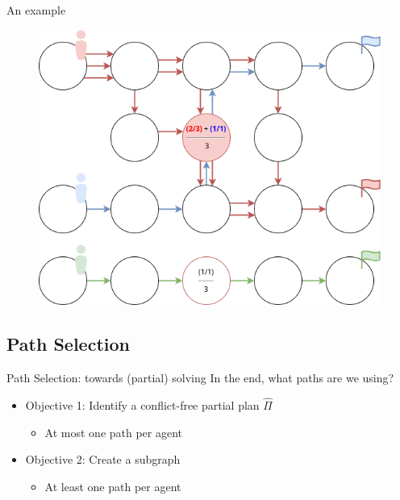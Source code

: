 \begin{frame}{An example}
    \begin{figure}[H]
        \centering
        \includegraphics[width=\widthimg]{img/pe_one_heatmap_value_example.drawio.png}
    \end{figure}
\end{frame}





\subsection{Path Selection}
\begin{frame}{Path Selection: towards (partial) solving}
    In the end, what paths are we using? 


    \begin{itemize}
        \item Objective 1: Identify a conflict-free partial plan \(\hat{\Pi}\)
        \begin{itemize}
            \item At most one path per agent 
        \end{itemize}
        \item Objective 2: Create a subgraph 
        \begin{itemize}
            \item At least one path per agent
        \end{itemize}
    \end{itemize}
\end{frame}
